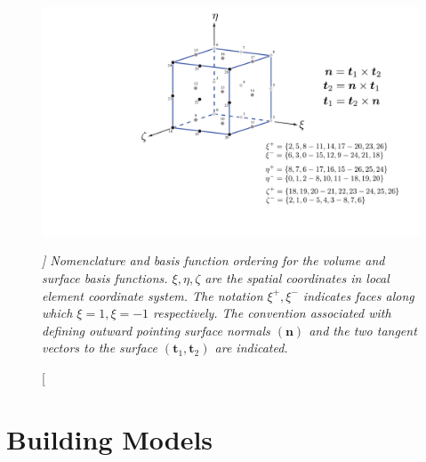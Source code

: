\documentclass[paper=a4, fontsize=10pt,twoside]{scrartcl}
\begin{document}
\begin{figure} [hbtp]
\center
\includegraphics[height=0.4\textheight]{figs/pt3d_basis_functions.pdf}
\caption[\itshape ]
{\itshape Nomenclature and basis function ordering for the volume and surface basis functions. $\xi, \eta, \zeta$ are the spatial coordinates in local element coordinate system. The notation $\xi^{+}, \xi^{-}$ indicates faces along which $\xi = 1, \xi = -1$ respectively. The convention associated with defining outward pointing surface normals $(\boldsymbol n)$ and the two tangent vectors to the surface $(\boldsymbol t_1,\boldsymbol t_2)$ are indicated.}
\label{fig:basis_functions}
\end{figure}



\section{Building Models}
\end{document}
